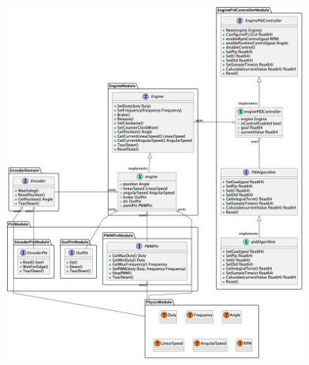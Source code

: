 \begin{figure}[H]
    \centering
    \includegraphics[height=0.4\textheight]{./part/Proyecto_ejecutivo/memoria_descriptiva/descripcionDelProyecto/control/uml/controlDomain}
    \caption[Diagrama de objetos de dominio]{}\label{fig:controlDomain}
\end{figure}

